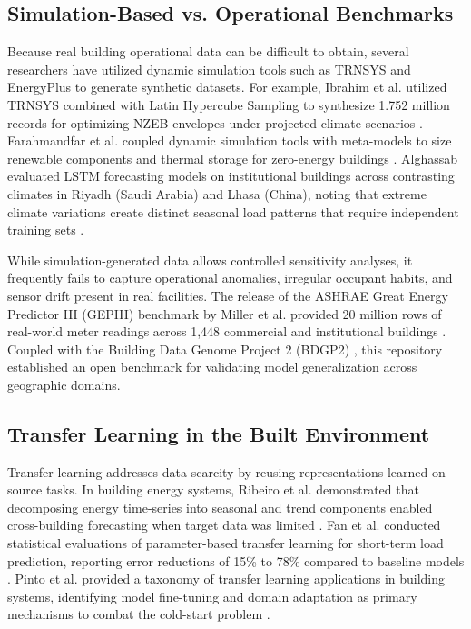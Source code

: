 \documentclass[conference]{IEEEtran}
\begin{document}
\subsection{Simulation-Based vs. Operational Benchmarks}
Because real building operational data can be difficult to obtain, several researchers have utilized dynamic simulation tools such as TRNSYS and EnergyPlus to generate synthetic datasets. For example, Ibrahim et al. utilized TRNSYS combined with Latin Hypercube Sampling to synthesize 1.752 million records for optimizing NZEB envelopes under projected climate scenarios \cite{b7}. Farahmandfar et al. coupled dynamic simulation tools with meta-models to size renewable components and thermal storage for zero-energy buildings \cite{b8}. Alghassab evaluated LSTM forecasting models on institutional buildings across contrasting climates in Riyadh (Saudi Arabia) and Lhasa (China), noting that extreme climate variations create distinct seasonal load patterns that require independent training sets \cite{b6}.

While simulation-generated data allows controlled sensitivity analyses, it frequently fails to capture operational anomalies, irregular occupant habits, and sensor drift present in real facilities. The release of the ASHRAE Great Energy Predictor III (GEPIII) benchmark by Miller et al. provided 20 million rows of real-world meter readings across 1,448 commercial and institutional buildings \cite{b1}. Coupled with the Building Data Genome Project 2 (BDGP2) \cite{b2}, this repository established an open benchmark for validating model generalization across geographic domains.

\subsection{Transfer Learning in the Built Environment}
Transfer learning addresses data scarcity by reusing representations learned on source tasks. In building energy systems, Ribeiro et al. demonstrated that decomposing energy time-series into seasonal and trend components enabled cross-building forecasting when target data was limited \cite{b3}. Fan et al. conducted statistical evaluations of parameter-based transfer learning for short-term load prediction, reporting error reductions of 15\% to 78\% compared to baseline models \cite{b4}. Pinto et al. provided a taxonomy of transfer learning applications in building systems, identifying model fine-tuning and domain adaptation as primary mechanisms to combat the cold-start problem \cite{b5}.
\end{document}
